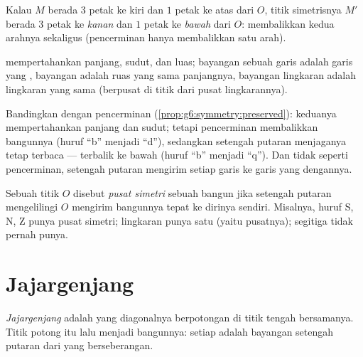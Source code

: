 \begin{example}\label{ex:g7:central:grid}
Kalau $M$ berada $3$ petak ke kiri dan $1$ petak ke atas dari $O$,
titik simetrisnya $M'$ berada $3$ petak ke \emph{kanan} dan $1$ petak
ke \emph{bawah} dari $O$:  membalikkan kedua arahnya
sekaligus (pencerminan hanya membalikkan satu arah).
\end{example}

\begin{proposition}\label{prop:g7:central:preserved}
 mempertahankan panjang, sudut,  dan luas;
bayangan sebuah garis adalah garis yang \emph{}, bayangan  adalah ruas  yang sama panjangnya, bayangan
lingkaran adalah lingkaran yang  sama (berpusat di titik
 dari pusat lingkarannya).
\end{proposition}
\admitted

\begin{remark}
Bandingkan dengan pencerminan (\cref{prop:g6:symmetry:preserved}):
keduanya mempertahankan panjang dan sudut; tetapi pencerminan
membalikkan bangunnya (huruf ``b'' menjadi ``d''), sedangkan
setengah putaran menjaganya tetap terbaca --- terbalik ke bawah
(huruf ``b'' menjadi ``q''). Dan tidak seperti pencerminan, setengah putaran
mengirim setiap garis ke garis yang  dengannya.
\end{remark}

\begin{definition}\label{def:g7:central:center}
Sebuah titik $O$ disebut \emph{pusat simetri}
sebuah bangun jika setengah putaran mengelilingi $O$ mengirim
bangunnya tepat ke dirinya sendiri. Misalnya, huruf S, N, Z punya
pusat simetri; lingkaran punya satu (yaitu pusatnya); segitiga tidak
pernah punya.
\end{definition}

\section{Jajargenjang}

\begin{definition}[Jajargenjang]\label{def:g7:central:parallelogram}
\emph{Jajargenjang} adalah  yang
diagonalnya berpotongan di titik tengah bersamanya. Titik potong itu
lalu menjadi  bangunnya: setiap  adalah
bayangan setengah putaran dari  yang berseberangan.
\end{definition}

